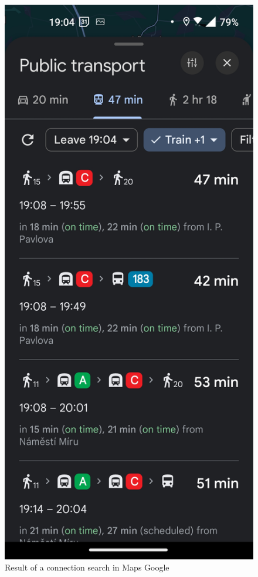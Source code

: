 \begin{figure}[h!]
\begin{minipage}[b]{0.45\textwidth}
    \end{minipage}
    \hfill
    \begin{minipage}[b]{0.45\textwidth}
        \centering
        \includegraphics[width=\textwidth]{img/screenshots/google_maps_result_2.jpg}
    \end{minipage}
    \caption{Result of a connection search in Maps Google}
    \label{fig:google_maps_1}
\end{figure}

